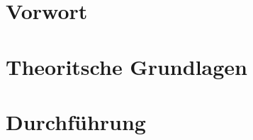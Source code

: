 \documentclass[a4paper, parskip=half]{scrartcl}
\begin{document}
\myTitlepage
\tableofcontents

\section{Vorwort}

\section{Theoritsche Grundlagen}

\section{Durchführung}
\end{document}
